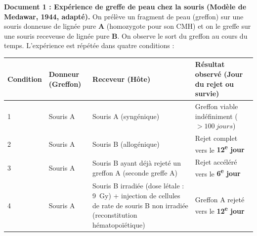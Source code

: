 \documentclass[11pt]{article}
\begin{document}
\vspace{0.5em}
\noindent\textbf{Document 1 : Expérience de greffe de peau chez la souris (Modèle de Medawar, 1944, adapté).}
On prélève un fragment de peau (greffon) sur une souris donneuse de lignée pure \textbf{A} (homozygote pour son CMH) et on le greffe sur une souris receveuse de lignée pure \textbf{B}. On observe le sort du greffon au cours du temps. L'expérience est répétée dans quatre conditions :
\begin{center}
\begin{tabularx}{\linewidth}{|l|X|X|X|}\hline
\textbf{Condition} & \textbf{Donneur (Greffon)} & \textbf{Receveur (Hôte)} & \textbf{Résultat observé (Jour du rejet ou survie)} \\ \hline
1 & Souris A & Souris A (syngénique) & Greffon viable indéfiniment ($> \SI{100}{jours}$) \\ \hline
2 & Souris A & Souris B (allogénique) & Rejet complet vers le \textbf{12\textsuperscript{e} jour} \\ \hline
3 & Souris A & Souris B ayant déjà rejeté un greffon A (seconde greffe A) & Rejet accéléré vers le \textbf{6\textsuperscript{e} jour} \\ \hline
4 & Souris A & Souris B irradiée (dose létale : \SI{9}{Gy}) + injection de cellules de rate de souris B non irradiée (reconstitution hématopoïétique) & Greffon A rejeté vers le \textbf{12\textsuperscript{e} jour} \\ \hline
\end{tabularx}
\end{center}
\end{document}
